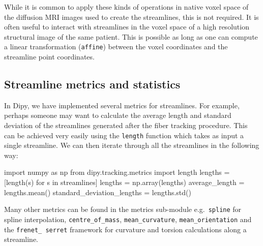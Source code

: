 \documentclass{bioinfo}
\begin{document}
While it is common to apply these kinds of operations in native voxel space of
the diffusion MRI images used to create the streamlines, this is not
required. It is often useful to interact with streamlines in the voxel space of
a high resolution structural image of the same patient. This is possible as
long as one can compute a linear transformation (\texttt{affine}) between the voxel coordinates and the streamline point coordinates.

\subsection{Streamline metrics and statistics}

In Dipy, we have implemented several metrics for streamlines. For example,
perhaps someone may want to calculate the
average length and standard deviation of the streamlines generated after the
fiber tracking procedure. This can be achieved very easily using the \texttt{length}
function which takes as input a single streamline. We can then iterate through
all the streamlines in the following way:
\begin{python}
import numpy as np
from dipy.tracking.metrics import length
lengths = [length(s) for s in streamlines]
lengths = np.array(lengths)
average_length = lengths.mean()
standard_deviation_lengths = lengths.std()
\end{python}
Many other metrics can be found in the metrics sub-module e.g.~\texttt{spline} for
spline interpolation, \texttt{centre\_of\_mass}, \texttt{mean\_curvature}, \texttt{mean\_orientation} and the \texttt{frenet\_ serret} framework for curvature
and torsion calculations along a streamline.
\end{document}
